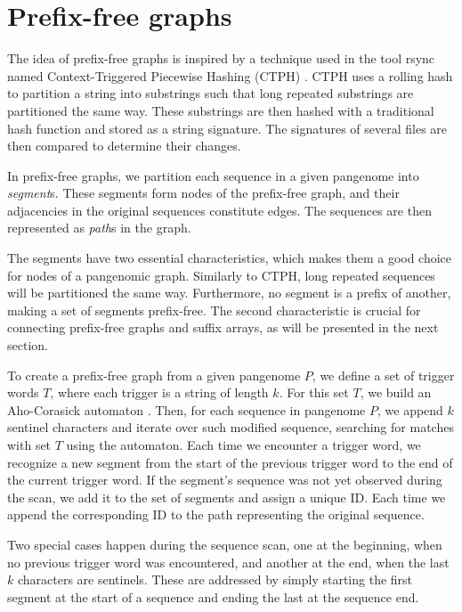 \section{Prefix-free graphs}
The idea of prefix-free graphs is inspired by a technique used in the tool rsync named Context-Triggered Piecewise Hashing (CTPH) \cite{kornblum2006identifying}.
CTPH uses a rolling hash to partition a string into substrings such that long repeated substrings are partitioned the same way.
These substrings are then hashed with a traditional hash function and stored as a string signature.
The signatures of several files are then compared to determine their changes.

In prefix-free graphs, we partition each sequence in a given pangenome into \emph{segment}s.
These segments form nodes of the prefix-free graph, and their adjacencies in the original sequences constitute edges.
The sequences are then represented as \emph{path}s in the graph.

The segments have two essential characteristics, which makes them a good choice for nodes of a pangenomic graph.
Similarly to CTPH, long repeated sequences will be partitioned the same way.
Furthermore, no segment is a prefix of another, making a set of segments prefix-free.
The second characteristic is crucial for connecting prefix-free graphs and suffix arrays, as will be presented in the next section.

To create a prefix-free graph from a given pangenome $P$, we define a set of trigger words $T$, where each trigger is a string of length $k$.
For this set $T$, we build an Aho-Corasick automaton \cite{aho1975efficient}.
Then, for each sequence in pangenome $P$, we append $k$ sentinel characters and iterate over such modified sequence, searching for matches with set $T$ using the automaton.
Each time we encounter a trigger word, we recognize a new segment from the start of the previous trigger word to the end of the current trigger word.
If the segment's sequence was not yet observed during the scan, we add it to the set of segments and assign a unique ID.
Each time we append the corresponding ID to the path representing the original sequence. 

Two special cases happen during the sequence scan, one at the beginning, when no previous trigger word was encountered, and another at the end, when the last $k$ characters are sentinels.
These are addressed by simply starting the first segment at the start of a sequence and ending the last at the sequence end.

